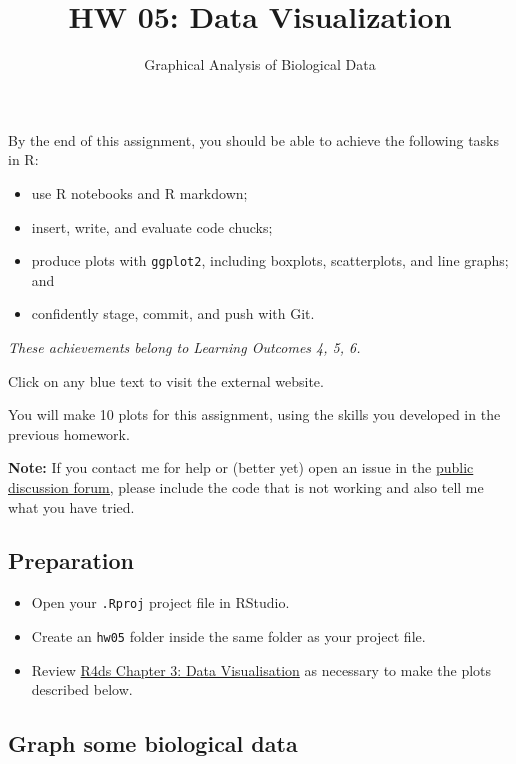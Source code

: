 \documentclass[]{article}
\title{HW 05: Data Visualization}
\subtitle{Graphical Analysis of Biological Data}
\author{}
\date{\vspace{-2.5em}}
\providecommand{\tightlist}{%
  \setlength{\itemsep}{0pt}\setlength{\parskip}{0pt}}
\begin{document}
\maketitle

By the end of this assignment, you should be able to achieve the
following tasks in R:

\begin{itemize}
\tightlist
\item
  use R notebooks and R markdown;
\item
  insert, write, and evaluate code chucks;
\item
  produce plots with \texttt{ggplot2}, including boxplots, scatterplots,
  and line graphs; and
\item
  confidently stage, commit, and push with Git.
\end{itemize}

\emph{These achievements belong to Learning Outcomes 4, 5, 6.}

Click on any blue text to visit the external website.

You will make 10 plots for this assignment, using the skills you
developed in the previous homework.

\textbf{Note:} If you contact me for help or (better yet) open an issue
in the \href{https://github.com/SEMO-GABD/public_discussion}{public
discussion forum,} please include the code that is not working and also
tell me what you have tried.

\hypertarget{preparation}{%
\subsection{Preparation}\label{preparation}}

\begin{itemize}
\item
  Open your \texttt{.Rproj} project file in RStudio.
\item
  Create an \texttt{hw05} folder inside the same folder as your project
  file.
\item
  Review \href{https://r4ds.had.co.nz/data-visualisation.html}{R4ds
  Chapter 3: Data Visualisation} as necessary to make the plots
  described below.
\end{itemize}

\hypertarget{graph-some-biological-data}{%
\subsection{Graph some biological
data}\label{graph-some-biological-data}}
\end{document}
